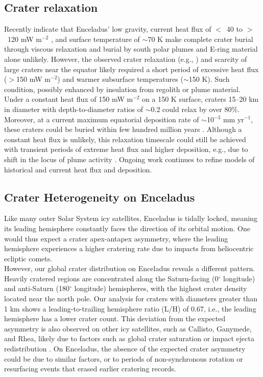 \documentclass[preprint,11pt,3p,times,authoryear]{elsarticle}
\begin{document}
{\subsection{Crater relaxation}
\label{subsec:relax}
Recently \citet{Bland2012,Martin2023} indicate that Enceladus’ low gravity, current heat flux of $<$~40 to $>$~120 mW m$^{-2}$ \citep{Cadek2019,Kinczyk2024}, and surface temperature of $\sim$70 K make complete crater burial through viscous relaxation and burial by south polar plumes and E-ring material alone unlikely. However, the observed crater relaxation (e.g., \citealt{Bland2012}) and scarcity of large craters near the equator likely required a short period of excessive heat flux ($>$150 mW m$^{-2}$) and warmer subsurface temperatures ($\sim$150 K). Such condition, possibly enhanced by insulation from regolith or plume material. Under a constant heat flux of 150 mW m$^{-2}$ on a 150 K surface, craters 15–20 km in diameter with depth-to-diameter ratios of $\sim$0.2 could relax by over 80\%. Moreover, at a current maximum equatorial deposition rate of $\sim$10$^{-3}$ mm yr$^{-1}$, these craters could be buried within few hundred million years \citep{Bland2012}. Although a constant heat flux is unlikely, this relaxation timescale could still be achieved with transient periods of extreme heat flux and higher deposition, e.g., due to shift in the locus of plume activity \citep{Bland2012}. Ongoing work continues to refine models of historical and current heat flux and deposition.


\subsection{Crater Heterogeneity on Enceladus}
\label{sub:hetero}
Like many outer Solar System icy satellites, Enceladus is tidally locked, meaning its leading hemisphere constantly faces the direction of its orbital motion. One would thus expect a crater apex-antapex asymmetry, where the leading hemisphere experiences a higher cratering rate due to impacts from heliocentric ecliptic comets.\\

However, our global crater distribution on Enceladus reveals a different pattern. Heavily cratered regions are concentrated along the Saturn-facing (0$^\circ$ longitude) and anti-Saturn (180$^\circ$ longitude) hemispheres, with the highest crater density located near the north pole. Our analysis for craters with diameters greater than 1 km shows a leading-to-trailing hemisphere ratio (L/H) of 0.67, i.e., the leading hemisphere has a lower crater count. This deviation from the expected asymmetry is also observed on other icy satellites, such as Callisto, Ganymede, and Rhea, likely due to factors such as global crater saturation or impact ejecta redistribution \citep{Zahnle2003,Xu2017,Schenk2020}. On Enceladus, the absence of the expected crater asymmetry could be due to similar factors, or to periods of non-synchronous rotation or resurfacing events that erased earlier cratering records.\\

}
\end{document}
